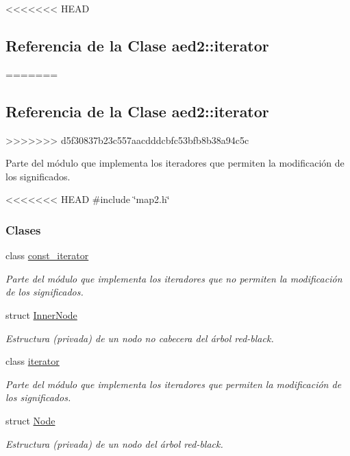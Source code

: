 <<<<<<< HEAD
\hypertarget{classaed2_1_1iterator}{\subsection{\-Referencia de la \-Clase aed2\-:\-:iterator}
\label{classaed2_1_1iterator}
}
=======
\hypertarget{classaed2_1_1iterator}{}\subsection{Referencia de la Clase aed2\+:\+:iterator}
\label{classaed2_1_1iterator}
>>>>>>> d5f30837b23c557aacdddcbfc53bfb8b38a94c5c


Parte del módulo que implementa los iteradores que permiten la modificación de los significados.  




<<<<<<< HEAD
{\ttfamily \#include \char`\"{}map2.\-h\char`\"{}}

\subsubsection*{\-Clases}
\begin{DoxyCompactItemize}
\item 
class \hyperlink{classaed2_1_1iterator_1_1const__iterator}{const\-\_\-iterator}
\begin{DoxyCompactList}\small\item\em \-Parte del módulo que implementa los iteradores que no permiten la modificación de los significados. \end{DoxyCompactList}\item 
struct \hyperlink{structaed2_1_1iterator_1_1InnerNode}{\-Inner\-Node}
\begin{DoxyCompactList}\small\item\em \-Estructura (privada) de un nodo no cabecera del árbol red-\/black. \end{DoxyCompactList}\item 
class \hyperlink{classaed2_1_1iterator_1_1iterator}{iterator}
\begin{DoxyCompactList}\small\item\em \-Parte del módulo que implementa los iteradores que permiten la modificación de los significados. \end{DoxyCompactList}\item 
struct \hyperlink{structaed2_1_1iterator_1_1Node}{\-Node}
\begin{DoxyCompactList}\small\item\em \-Estructura (privada) de un nodo del árbol red-\/black. \end{DoxyCompactList}\end{DoxyCompactItemize}
